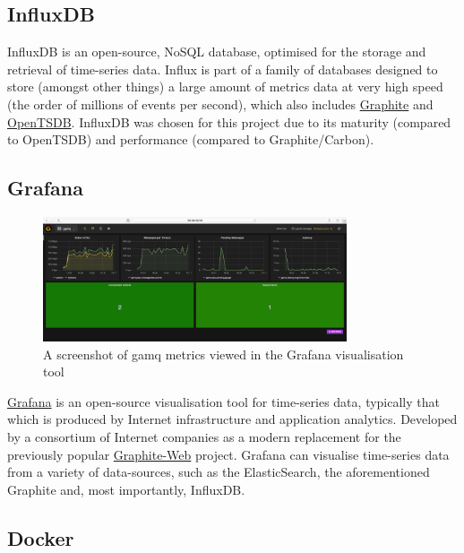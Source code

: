 \subsection{InfluxDB}
\label{sub:InfluxDB}

InfluxDB is an open-source, NoSQL database, optimised for the storage and
retrieval of \gls{time-series data}. Influx is part of a family of databases
designed to store (amongst other things) a large amount of metrics data at very
high speed (the order of millions of events per second), which also includes
\href{http://graphite.wikidot.com/}{Graphite} and
\href{http://opentsdb.net/}{OpenTSDB}. InfluxDB was chosen for this project due
to its maturity (compared to OpenTSDB) and performance (compared to
Graphite/Carbon).

\subsection{Grafana}
\label{sub:Grafana}

\begin{figure}[H]
  \centering
  \includegraphics[width=0.8\textwidth]{figures/grafanaMidBenchmark}
  \caption{A screenshot of \gls{gamq} metrics viewed in the Grafana visualisation tool}
  \label{fig:grafanaMidBenchmark}
\end{figure}

\href{http://grafana.org/}{Grafana} is an open-source visualisation tool for
\gls{time-series data}, typically that which is produced by Internet
infrastructure and application analytics. Developed by a consortium of Internet
companies as a modern replacement for the previously popular
\href{https://github.com/graphite-project/graphite-web}{Graphite-Web} project.
Grafana can visualise \gls{time-series data} from a variety of data-sources,
such as the ElasticSearch, the aforementioned Graphite and, most importantly,
InfluxDB.

\subsection{Docker}
\label{sub:dockerDesign}

